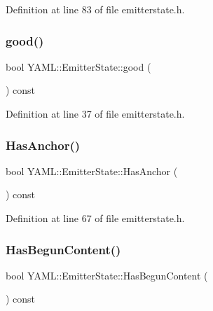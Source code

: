 Definition at line 83 of file emitterstate.\+h.

\mbox{\label{class_y_a_m_l_1_1_emitter_state_a040193f3ac0fdb1c09987848196b02ce}} 
\subsubsection{\texorpdfstring{good()}{good()}}
{\footnotesize\ttfamily bool Y\+A\+M\+L\+::\+Emitter\+State\+::good (\begin{DoxyParamCaption}{ }\end{DoxyParamCaption}) const\hspace{0.3cm}{\ttfamily [inline]}}



Definition at line 37 of file emitterstate.\+h.

\mbox{\label{class_y_a_m_l_1_1_emitter_state_a14a9aa742edcd9d249cc9b0da79a36a3}} 
\subsubsection{\texorpdfstring{HasAnchor()}{HasAnchor()}}
{\footnotesize\ttfamily bool Y\+A\+M\+L\+::\+Emitter\+State\+::\+Has\+Anchor (\begin{DoxyParamCaption}{ }\end{DoxyParamCaption}) const\hspace{0.3cm}{\ttfamily [inline]}}



Definition at line 67 of file emitterstate.\+h.

\mbox{\label{class_y_a_m_l_1_1_emitter_state_a7b49f9ca8371bb1845def9f3aec04a7d}} 
\subsubsection{\texorpdfstring{HasBegunContent()}{HasBegunContent()}}
{\footnotesize\ttfamily bool Y\+A\+M\+L\+::\+Emitter\+State\+::\+Has\+Begun\+Content (\begin{DoxyParamCaption}{ }\end{DoxyParamCaption}) const\hspace{0.3cm}{\ttfamily [inline]}}



